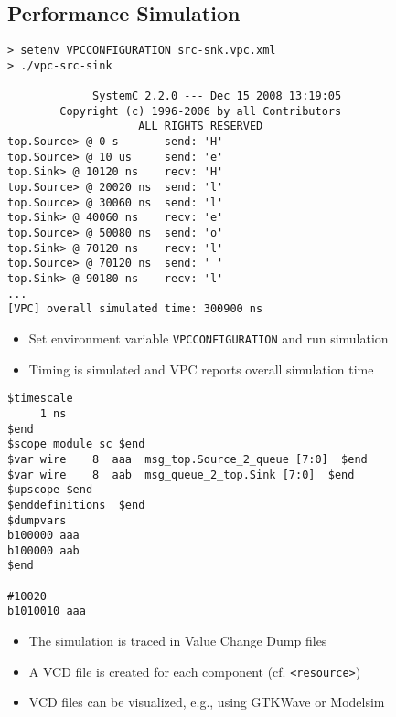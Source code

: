 \subsection{Performance Simulation}


\begin{frame}[fragile=singleslide]
\begin{lstlisting}
> setenv VPCCONFIGURATION src-snk.vpc.xml
> ./vpc-src-sink

             SystemC 2.2.0 --- Dec 15 2008 13:19:05
        Copyright (c) 1996-2006 by all Contributors
                    ALL RIGHTS RESERVED            
top.Source> @ 0 s       send: 'H'
top.Source> @ 10 us     send: 'e'
top.Sink> @ 10120 ns    recv: 'H'
top.Source> @ 20020 ns  send: 'l'
top.Source> @ 30060 ns  send: 'l'
top.Sink> @ 40060 ns    recv: 'e'
top.Source> @ 50080 ns  send: 'o'
top.Sink> @ 70120 ns    recv: 'l'
top.Source> @ 70120 ns  send: ' '
top.Sink> @ 90180 ns    recv: 'l'
...
[VPC] overall simulated time: 300900 ns
\end{lstlisting}
\begin{itemize}
\item Set environment variable \lstinline!VPCCONFIGURATION! and run simulation
\item Timing is simulated and VPC reports overall simulation time 
\end{itemize}
\end{frame}


\begin{frame}[fragile=singleslide]
\begin{lstlisting}
$timescale
     1 ns
$end
$scope module sc $end
$var wire    8  aaa  msg_top.Source_2_queue [7:0]  $end
$var wire    8  aab  msg_queue_2_top.Sink [7:0]  $end
$upscope $end
$enddefinitions  $end
$dumpvars
b100000 aaa
b100000 aab
$end

#10020
b1010010 aaa
\end{lstlisting}
\begin{itemize}
\item The simulation is traced in Value Change Dump files
\item A VCD file is created for each component (cf. \lstinline!<resource>!)
\item VCD files can be visualized, e.g., using GTKWave or Modelsim
\end{itemize}
\end{frame}


